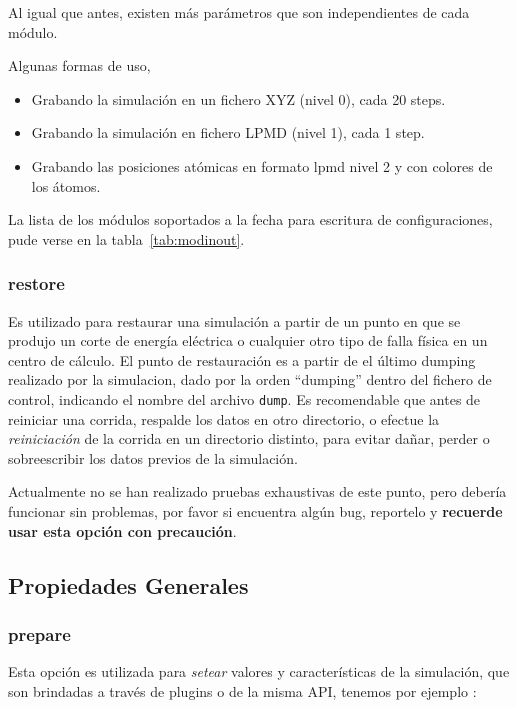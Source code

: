 Al igual que antes, existen m\'as par\'ametros que son independientes de cada m\'odulo.

Algunas formas de uso,

\begin{itemize}
 \item Grabando la simulaci\'on en un fichero XYZ (nivel 0), cada 20 steps.
 \item Grabando la simulaci\'on en fichero LPMD (nivel 1), cada 1 step.
 \item Grabando las posiciones at\'omicas en formato lpmd nivel 2 y con colores de los \'atomos.
\end{itemize}

La lista de los m\'odulos soportados a la fecha para escritura de configuraciones, pude verse en la tabla~\ref{tab:modinout}.

\subsubsection{restore}

Es utilizado para restaurar una simulaci\'on a partir de un punto en que se produjo un corte de energ\'ia el\'ectrica o cualquier otro tipo de falla f\'isica en un centro de c\'alculo. El punto de restauraci\'on es a partir de el \'ultimo dumping realizado por la simulacion, dado por la orden ``dumping'' dentro del fichero de control, indicando el nombre del archivo \verb|dump|. Es recomendable que antes de reiniciar una corrida, respalde los datos en otro directorio, o efectue la \textit{reiniciaci\'on} de la corrida en un directorio distinto, para evitar da\~nar, perder o sobreescribir los datos previos de la simulaci\'on.

Actualmente no se han realizado pruebas exhaustivas de este punto, pero deber\'ia funcionar sin problemas, por favor si encuentra alg\'un bug, reportelo y \textbf{recuerde usar esta opci\'on con precauci\'on}.

\subsection{Propiedades Generales}
\subsubsection{prepare}
Esta opci\'on es utilizada para \textit{setear} valores y caracter\'isticas de la simulaci\'on, que son brindadas a trav\'es de plugins o de la misma API, tenemos por ejemplo :

